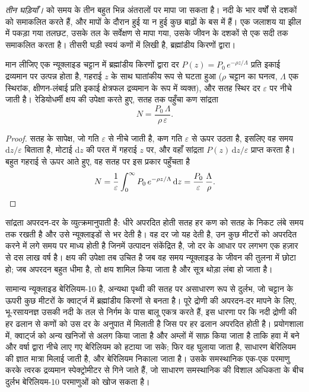 \emph{तीन घड़ियाँ।}  को समय के तीन बहुत भिन्न अंतरालों पर मापा जा सकता है। नदी के भार वर्षों से दशकों को समाकलित करते हैं, और मापों के दौरान हुई या न हुई कुछ बाढ़ों के बस में हैं। एक जलाशय या झील में पकड़ा गया तलछट, उसके तल के सर्वेक्षण से मापा गया, उसके जीवन के दशकों से एक सदी तक समाकलित करता है। तीसरी घड़ी स्वयं कणों में लिखी है, ब्रह्मांडीय किरणों द्वारा।

\begin{proposition}[ब्रह्मांडीय न्यूक्लाइड और अपरदन]\label{prop:b1:erosion-transport:cosmogenic}
मान लीजिए एक न्यूक्लाइड चट्टान में ब्रह्मांडीय किरणों द्वारा दर $P(z) = P_0\,e^{-\rho z/\Lambda}$ प्रति इकाई द्रव्यमान पर उत्पन्न होता है, गहराई $z$ के साथ घातांकीय रूप से घटता हुआ ($\rho$ चट्टान का घनत्व, $\Lambda$ एक स्थिरांक, क्षीणन-लंबाई प्रति इकाई क्षेत्रफल द्रव्यमान के रूप में व्यक्त), और सतह स्थिर दर $\varepsilon$ पर नीचे जाती है। रेडियोधर्मी क्षय की उपेक्षा करते हुए, सतह तक पहुँचा कण सांद्रता
\[
  N = \frac{P_0\,\Lambda}{\rho\,\varepsilon}.
\]
\end{proposition}

\begin{proof}
सतह के सापेक्ष, जो गति $\varepsilon$ से नीचे जाती है, कण गति $\varepsilon$ से ऊपर उठता है, इसलिए वह समय $\mathrm dz/\varepsilon$ बिताता है, मोटाई $\mathrm dz$ की परत में गहराई $z$ पर, और वहाँ सांद्रता $P(z)\,\mathrm dz/\varepsilon$ प्राप्त करता है। बहुत गहराई से ऊपर आते हुए, वह सतह पर इस प्रकार पहुँचता है
\[
  N = \frac{1}{\varepsilon}\int_0^{\infty} P_0\,e^{-\rho z/\Lambda}\,\mathrm dz
  = \frac{P_0}{\varepsilon}\,\frac{\Lambda}{\rho}. \qedhere
\]
\end{proof}

सांद्रता अपरदन-दर के व्युत्क्रमानुपाती है: धीरे अपरदित होती सतह हर कण को सतह के निकट लंबे समय तक रखती है और उसे न्यूक्लाइडों से भर देती है। वह दर जो यह देती है, उन कुछ मीटरों को अपरदित करने में लगे समय पर माध्य होती है जिनमें उत्पादन संकेंद्रित है, जो दर के आधार पर लगभग एक हज़ार से दस लाख वर्ष है। क्षय की उपेक्षा तब उचित है जब वह समय न्यूक्लाइड के जीवन की तुलना में छोटा हो; जब अपरदन बहुत धीमा है, तो क्षय शामिल किया जाता है और सूत्र थोड़ा लंबा हो जाता है।

\begin{inthelab}[नदी की बालू में बेरिलियम-10]
सामान्य न्यूक्लाइड बेरिलियम-10 है, अन्यथा पृथ्वी की सतह पर असाधारण रूप से दुर्लभ, जो चट्टान के ऊपरी कुछ मीटरों के क्वार्ट्ज में ब्रह्मांडीय किरणों से बनता है। पूरे द्रोणी की अपरदन-दर मापने के लिए, भू-रसायनज्ञ उसकी नदी के तल से निर्गम के पास बालू एकत्र करते हैं, इस धारणा पर कि नदी द्रोणी की हर ढलान से कणों को उस दर के अनुपात में मिलाती है जिस पर हर ढलान अपरदित होती है। प्रयोगशाला में, क्वार्ट्ज को अन्य खनिजों से अलग किया जाता है और अम्लों में साफ़ किया जाता है ताकि हवा में बने और वर्षा द्वारा नीचे लाए गए बेरिलियम को हटाया जा सके; फिर वह घुलाया जाता है, साधारण बेरिलियम की ज्ञात मात्रा मिलाई जाती है, और बेरिलियम निकाला जाता है। उसके समस्थानिक एक-एक परमाणु करके त्वरक द्रव्यमान स्पेक्ट्रोमीटर से गिने जाते हैं, जो साधारण समस्थानिक की विशाल अधिकता के बीच दुर्लभ बेरिलियम-10 परमाणुओं को खोज सकता है।
\end{inthelab}

